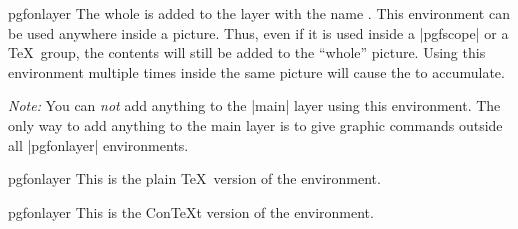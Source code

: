 \begin{environment}{{pgfonlayer}}
    The whole  is added to the layer with the name
    . This environment can be used anywhere inside a picture.
    Thus, even if it is used inside a |{pgfscope}| or a \TeX\ group, the
    contents will still be added to the ``whole'' picture. Using this
    environment multiple times inside the same picture will cause the
     to accumulate.

    \emph{Note:} You can \emph{not} add anything to the |main| layer using this
    environment. The only way to add anything to the main layer is to give
    graphic commands outside all |{pgfonlayer}| environments.
\begin{codeexample}[]
\end{codeexample}
\end{environment}

\begin{plainenvironment}{{pgfonlayer}}
    This is the plain \TeX\ version of the environment.
\end{plainenvironment}

\begin{contextenvironment}{{pgfonlayer}}
    This is the Con\TeX t version of the environment.
\end{contextenvironment}



